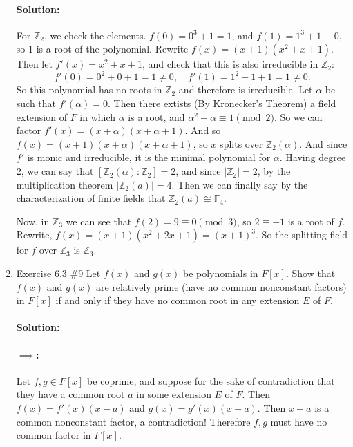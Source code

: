 \documentclass{article}
\begin{document}
\begin{enumerate}
\paragraph{Solution:} For $\mathbb{Z}_2$, we check the elements. $f(0)=0^3+1=1$, and $f(1)=1^3+1\equiv 0$, so $1$ is a root of the polynomial.
Rewrite $f(x)=(x+1)(x^2+x+1)$. Then let $f'(x)=x^2+x+1$, and check that this is also irreducible in $\mathbb{Z}_2$:
\[
f'(0)=0^2+0+1= 1\neq 0,\quad f'(1)=1^2+1+1=1\neq 0
.\] 
So this polynomial has no roots in $\mathbb{Z}_2$ and therefore is irreducible. Let $\alpha$ be such that $f'(\alpha)=0$. Then there extists (By Kronecker's Theorem) a field extension
of $F$ in which $\alpha$ is a root, and $\alpha^2+\alpha\equiv  1\pmod{2} $.
So we can factor $f'(x)=(x+\alpha)(x+\alpha+1)$. And so $f(x)=(x+1)(x+\alpha)(x+\alpha+1)$, so $x$ splits over $\mathbb{Z}_2(\alpha)$.
And since  $f'$ is monic and irreducible, it is the minimal polynomial for $\alpha$. Having degree $2$, we can say that $[\mathbb{Z}_2(\alpha):\mathbb{Z}_2]=2$, and since
$|\mathbb{Z}_2|=2$, by the multiplication theorem $|\mathbb{Z}_2(a)|=4$. Then we can finally say by the characterization of finite fields that
$\mathbb{Z}_2(a)\cong \mathbb{F}_4$.

Now, in $\mathbb{Z}_3$ we can see that $f(2)=9\equiv 0\pmod{3} $, so $2\equiv -1$ is a root of $f$. Rewrite, $f(x)=(x+1)(x^2+2x+1)=(x+1)^3$. So the splitting field
for $f$ over $\mathbb{Z}_3$ is $\mathbb{Z}_3$.

\item Exercise 6.3 \#9 Let $f(x)$ and $g(x)$ be polynomials in $F[x].$ Show that $f(x)$ and $g(x)$
are relatively prime (have no common nonconstant factors) in $F[x]$ if and only if
they have no common root in any extension $E$ of $F.$

\paragraph{Solution: }
\paragraph{$\implies$: }
Let $f,g\in F[x]$ be coprime, and suppose for the sake of contradiction that they have a common root $a$ in some extension $E$ of $F$.
Then $f(x)=f'(x)(x-a)$ and $g(x)=g'(x)(x-a)$. Then  $x-a$ is a common nonconstant factor, a contradiction!
Therefore $f,g$ must have no common factor in $F[x]$.

\end{enumerate}
\end{document}

